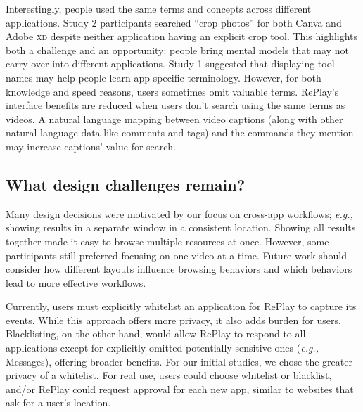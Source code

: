 Interestingly, people used the same terms and concepts across different applications. Study 2 participants searched ``crop photos'' for both Canva and Adobe \textsc{xd} despite neither application having an explicit crop tool. This highlights both a challenge and an opportunity: people bring mental models that may not carry over into different applications. Study 1 suggested that displaying tool names may help people learn app-specific terminology. However, for both knowledge and speed reasons, users sometimes omit valuable terms. RePlay's interface benefits are reduced when users don't search using the same terms as videos. A natural language mapping \cite{Adar2014} between video captions (along with other natural language data like comments and tags) and the commands they mention may increase captions' value for search.

\subsection{What design challenges remain?}
Many design decisions were motivated by our focus on cross-app workflows; \textit{e.g.,} showing results in a separate window in a consistent location. Showing all results together made it easy to browse multiple resources at once. However, some participants still preferred focusing on one video at a time. Future work should consider how different layouts influence browsing behaviors and which behaviors lead to more effective workflows.

Currently, users must explicitly whitelist an application for RePlay to capture its events. While this approach offers more privacy, it also adds burden for users.  Blacklisting, on the other hand, would allow RePlay to respond to all applications except for explicitly-omitted potentially-sensitive ones (\textit{e.g.,} Messages), offering broader benefits. For our initial studies, we chose the greater privacy of a whitelist. For real use, users could choose whitelist or blacklist, and/or RePlay could request approval for each new app, similar to websites that ask for a user's location.

